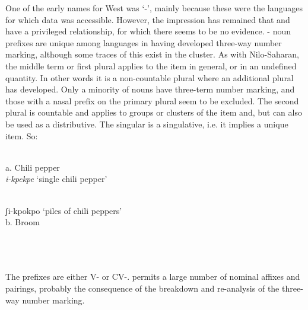 \documentclass[output=paper]{langsci/langscibook}
\begin{document}
One of the early names for West  was ‘-’, mainly because these were the languages for which data was accessible. However, the impression has remained that  and  have a privileged relationship, for which there seems to be no evidence. - noun prefixes are unique among  languages in having developed three-way number marking, although some traces of this exist in the  cluster. As with Nilo-Saharan, the middle term or first plural applies to the item in general, or in an undefined quantity. In other words it is a non-countable plural where an additional plural has developed. Only a minority of nouns have three-term number marking, and those with a nasal prefix on the primary plural seem to be excluded. The second plural is countable and applies to groups or clusters of the item and, but can also be used as a distributive. The singular is a singulative, i.e. it implies a unique item. So:

\ea\label{ex:key:}
\\
       a. Chili pepper\\
\glt   \textit{i-kpekpe} ‘single chili pepper’
\z

\ea\label{ex:key:}
\\
\gll   ʃi-kpokpo  {‘piles of chili peppers’}\\
\glt b. Broom
\z

\ea\label{ex:key:}
\\
\ea\label{ex:key:}
\\
\ea\label{ex:key:}
\\
The prefixes are either V- or CV-.  permits a large number of nominal affixes and pairings, probably the consequence of the breakdown and re-analysis of the three-way number marking.
\end{document}
